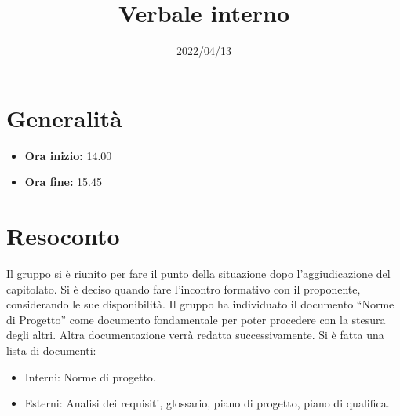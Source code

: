 \documentclass{classes/base}
\title{Verbale interno}
\date{2022/04/13}
\author{\angela}
\renewcommand{\maketitle}{
    
}
\begin{document}
    \maketitle

    \section*{Generalità}
    \begin{itemize}
        \item \textbf{Ora inizio:} 14.00
        \item \textbf{Ora fine:} 15.45
    \end{itemize}

    \section*{Resoconto}
    Il gruppo si è riunito per fare il punto della situazione dopo l’aggiudicazione del capitolato.
    Si è deciso quando fare l’incontro formativo con il proponente, considerando le sue disponibilità.
    Il gruppo ha individuato il documento “Norme di Progetto” come documento fondamentale per poter procedere con la stesura degli altri.
    Altra documentazione verrà redatta successivamente. Si è fatta una lista di documenti:
    \begin{itemize}
        \item Interni: Norme di progetto.
        \item Esterni: Analisi dei requisiti, glossario, piano di progetto, piano di qualifica.
    \end{itemize}
\end{document}
